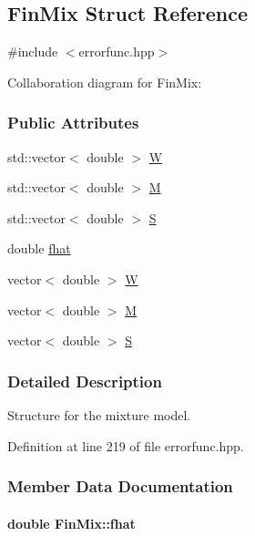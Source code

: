 \hypertarget{structFinMix}{\subsection{\-Fin\-Mix \-Struct \-Reference}
\label{structFinMix}
}


{\ttfamily \#include $<$errorfunc.\-hpp$>$}



\-Collaboration diagram for \-Fin\-Mix\-:
\subsubsection*{\-Public \-Attributes}
\begin{DoxyCompactItemize}
\item 
std\-::vector$<$ double $>$ \hyperlink{structFinMix_a5e3e0c0a40f75ec6df8e4513828342be}{\-W}
\item 
std\-::vector$<$ double $>$ \hyperlink{structFinMix_af6b13f65037448ae8a22965ccffd9330}{\-M}
\item 
std\-::vector$<$ double $>$ \hyperlink{structFinMix_ac96c7d4bec4e00d981a609a4ffd0c3d3}{\-S}
\item 
double \hyperlink{structFinMix_a7d058312162e6b9ccb408ddc688a274f}{fhat}
\item 
vector$<$ double $>$ \hyperlink{structFinMix_ace04e4bbc987bf52978775e974845fcc}{\-W}
\item 
vector$<$ double $>$ \hyperlink{structFinMix_aaef54338ed42427daaa1a4567f042a26}{\-M}
\item 
vector$<$ double $>$ \hyperlink{structFinMix_a3a9d330805184d137baf041fcc18c24a}{\-S}
\end{DoxyCompactItemize}


\subsubsection{\-Detailed \-Description}
\-Structure for the mixture model. 

\-Definition at line 219 of file errorfunc.\-hpp.



\subsubsection{\-Member \-Data \-Documentation}
\hypertarget{structFinMix_a7d058312162e6b9ccb408ddc688a274f}{
\paragraph[{fhat}]{\setlength{\rightskip}{0pt plus 5cm}double {\bf \-Fin\-Mix\-::fhat}}}\label{structFinMix_a7d058312162e6b9ccb408ddc688a274f}


